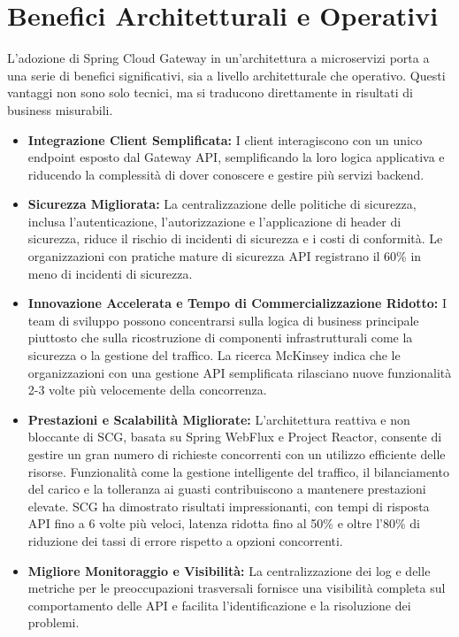 \section{Benefici Architetturali e Operativi}

L'adozione di Spring Cloud Gateway in un'architettura a microservizi porta a una serie di benefici significativi, sia a livello architetturale che operativo. Questi vantaggi non sono solo tecnici, ma si traducono direttamente in risultati di business misurabili.

\begin{itemize}
    \item \textbf{Integrazione Client Semplificata:} I client interagiscono con un unico endpoint esposto dal Gateway API, semplificando la loro logica applicativa e riducendo la complessità di dover conoscere e gestire più servizi backend.
    \item \textbf{Sicurezza Migliorata:} La centralizzazione delle politiche di sicurezza, inclusa l'autenticazione, l'autorizzazione e l'applicazione di header di sicurezza, riduce il rischio di incidenti di sicurezza e i costi di conformità. Le organizzazioni con pratiche mature di sicurezza API registrano il 60\% in meno di incidenti di sicurezza.
    \item \textbf{Innovazione Accelerata e Tempo di Commercializzazione Ridotto:} I team di sviluppo possono concentrarsi sulla logica di business principale piuttosto che sulla ricostruzione di componenti infrastrutturali come la sicurezza o la gestione del traffico. La ricerca McKinsey indica che le organizzazioni con una gestione API semplificata rilasciano nuove funzionalità 2-3 volte più velocemente della concorrenza.
    \item \textbf{Prestazioni e Scalabilità Migliorate:} L'architettura reattiva e non bloccante di SCG, basata su Spring WebFlux e Project Reactor, consente di gestire un gran numero di richieste concorrenti con un utilizzo efficiente delle risorse. Funzionalità come la gestione intelligente del traffico, il bilanciamento del carico e la tolleranza ai guasti contribuiscono a mantenere prestazioni elevate. SCG ha dimostrato risultati impressionanti, con tempi di risposta API fino a 6 volte più veloci, latenza ridotta fino al 50\% e oltre l'80\% di riduzione dei tassi di errore rispetto a opzioni concorrenti.
    \item \textbf{Migliore Monitoraggio e Visibilità:} La centralizzazione dei log e delle metriche per le preoccupazioni trasversali fornisce una visibilità completa sul comportamento delle API e facilita l'identificazione e la risoluzione dei problemi.

\end{itemize}
